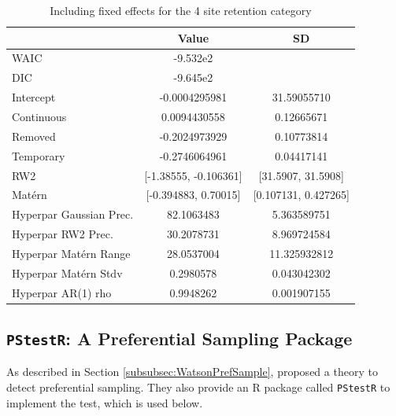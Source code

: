 \documentclass{article}
\begin{document}
\begin{table}[ht]
    \centering
    \begin{tabular}{l|c|c}
         & Value & SD  \\
         \hline
         WAIC & -9.532e2 & \\
         DIC & -9.645e2 & \\
         Intercept & -0.0004295981  & 31.59055710 \\
         Continuous & 0.0094430558  & 0.12665671   \\
         Removed & -0.2024973929   & 0.10773814   \\
         Temporary & -0.2746064961   & 0.04417141\\
         RW2 & [-1.38555, -0.106361] & [31.5907, 31.5908] \\
         Mat\'{e}rn & [-0.394883, 0.70015] & [0.107131, 0.427265] \\
         Hyperpar Gaussian Prec. & 82.1063483 & 5.363589751  \\
         Hyperpar RW2 Prec. & 30.2078731   &  8.969724584 \\
         Hyperpar Mat\'{e}rn Range & 28.0537004  & 11.325932812  \\
         Hyperpar Mat\'{e}rn Stdv & 0.2980578  & 0.043042302   \\
         Hyperpar AR(1) rho & 0.9948262   & 0.001907155  
    \end{tabular}
    \caption{Including fixed effects for the 4 site retention category }
    \label{tab:model_INLA_4site_Retention}
\end{table}



\subsection{\texttt{PStestR}: A Preferential Sampling Package}
\label{subsec:prefsamppkg}

As described in Section \ref{subsubsec:WatsonPrefSample}, \citet{watson2020} proposed a theory to detect preferential sampling.  They also provide an R package called \texttt{PStestR} to implement the test, which is used below.
\end{document}
